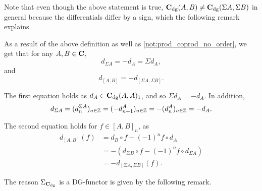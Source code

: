 Note that even though the above statement is true, \( \operatorname{\mathbf{C}}_{\operatorname{dg}}(A, B) \neq \operatorname{\mathbf{C}}_{\operatorname{dg}}(\Sigma A, \Sigma B) \) in general because the differentials differ by a sign, which the following remark explains.

\begin{remark}
    \label{rem:c_dg_sigma_d_equal_minus_d}
    As a result of the above definition as well as \autoref{not:prod_coprod_no_order}, we get that for any \( A, B \in \operatorname{\mathbf{C}} \),
    \[
        d_{\Sigma A} = - d_A = \Sigma d_A,
    \]
    and
    \[
        d_{[A, B]} = - d_{[\Sigma A, \Sigma B]}.
    \]

    The first equation holds as \( d_A \in \operatorname{\mathbf{C}}_{\operatorname{dg}}(A, A)_1 \), and so \( \Sigma d_A = - d_A \). In addition,
    \[
        d_{\Sigma A} = (d_n^{\Sigma A})_{n \in {\mathbb{Z}}} = (- d_{n + 1}^A)_{n \in {\mathbb{Z}}} = - (d_n^A)_{n \in {\mathbb{Z}}} = - d_A.
    \]

    The second equation holds for \( f \in [A, B]_n \), as
    \begin{align*}
        d_{[A, B]} (f) &= d_B \circ f - (-1)^n f \circ d_A \\
        &= - (d_{\Sigma B} \circ f - (-1)^n f \circ d_{\Sigma A}) \\
        &= - d_{[\Sigma A, \Sigma B]} (f).
    \end{align*}
\end{remark}

The reason \( \Sigma_{\operatorname{\mathbf{C}}_{\operatorname{dg}}} \) is a DG-functor is given by the following remark. 

